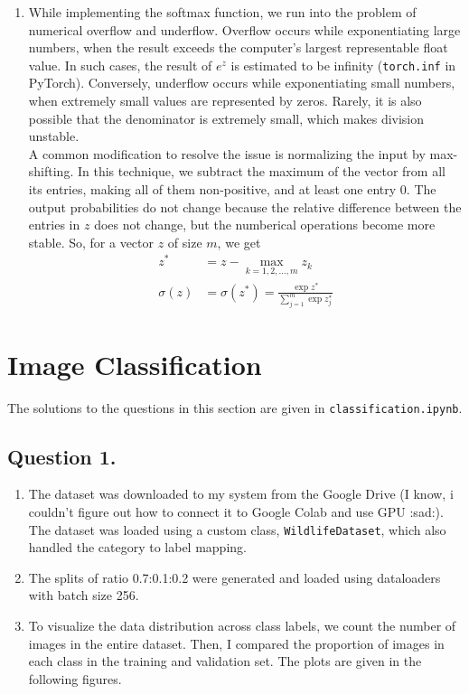 \documentclass[10pt]{article}
\begin{document}
\begin{enumerate}[label=(\alph*)]
        \item While implementing the softmax function, we run into the problem of numerical overflow
        and underflow. Overflow occurs while exponentiating large numbers, when the result exceeds the
        computer's largest representable float value. In such cases, the result of $e^{z}$ is estimated to be
        infinity (\texttt{torch.inf} in PyTorch). Conversely, underflow occurs while exponentiating small
        numbers, when extremely small values are represented by zeros. Rarely, it is also possible
        that the denominator is extremely small, which makes division unstable. \\
        A common modification to resolve the issue is normalizing the input by max-shifting. In this
        technique, we subtract the maximum of the vector from all its entries, making all of them
        non-positive, and at least one entry 0. The output probabilities do not change because the relative
        difference between the entries in $z$ does not change, but the numberical
        operations become more stable. So, for a vector $z$ of size $m$, we get
        \begin{align*}
            z^{*} &= z - \max_{k = 1, 2, \dots, m}{z_{k}} \\
            \sigma(z) &= \sigma(z^{*}) = \frac{\exp{z^{*}}}{\sum_{j=1}^{m} \exp{z_{j}^{*}}}
        \end{align*}
    \end{enumerate}

    \section*{\textbf{Image Classification}}
    The solutions to the questions in this section are given in \texttt{classification.ipynb}.

    \subsection*{\textbf{Question 1.}}
    \begin{enumerate}[label=(\alph*)]
        \item The dataset was downloaded to my system from the Google Drive (I know, i
        couldn't figure out how to connect it to Google Colab and use GPU :sad:). The
        dataset was loaded using a custom class, \texttt{WildlifeDataset},
        which also handled the category to label mapping.
        \item The splits of ratio 0.7:0.1:0.2 were generated and loaded using dataloaders
        with batch size 256.
        \item To visualize the data distribution across class labels, we count the number
        of images in the entire dataset. Then, I compared the proportion of images in each
        class in the training and validation set. The plots are given in the following figures.
    \end{enumerate}
\end{document}
